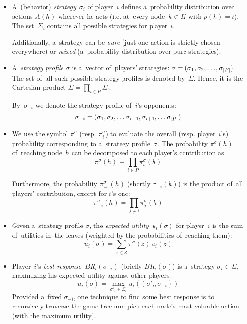 \begin{itemize}
  \item A~(behavior) \emph{strategy}~$\sigma_i$ of player~$i$ defines a~probability distribution over actions $A(h)$ wherever he acts (i.e. at~every node~$h \in H$ with $p(h) = i$).
    The set~$\Sigma_i$ contains all possible strategies for player~$i$.

  Additionally, a~strategy can be \emph{pure} (just one action is strictly chosen everywhere) or \emph{mixed} (a~probability distribution over pure strategies).

  \item A~\emph{strategy profile} $\sigma$ is a~vector of~players' strategies:
    $\sigma = (\sigma_1, \sigma_2, \ldots, \sigma_ {\left|{P}\right|})$.
    The set of~all such possible strategy profiles is denoted by~$\Sigma$.
    Hence, it is the Cartesian product $\Sigma = \prod_{i \in P} \Sigma_i$.

    By~$\sigma_{-i}$ we denote the strategy profile of~$i$'s opponents:
    \[ \sigma_{-i} = (\sigma_1, \sigma_2, \ldots \sigma_{i-1}, \sigma_{i+1}, \ldots \sigma_ {\left|{P}\right|}) \]

  \item We use the symbol $\pi^\sigma$ (resp. $\pi_i^\sigma$) to evaluate the overall (resp. player~$i$'s) probability corresponding to a~strategy profile~$\sigma$.
    The probability $\pi^\sigma(h)$ of~reaching node~$h$ can be decomposed to each player's contribution as
    \[ \pi ^\sigma(h) = \prod _{i \in P} \pi _i ^\sigma (h) \]

    Furthermore, the probability $\pi _{-i} ^\sigma (h)$ (shortly $\pi _{-i} (h)$) is the product of~all players' contribution, except for $i$'s one:
    \[ \pi _{-i} ^\sigma(h) = \prod _{j \ne i} \pi _j ^\sigma (h) \]
    
  \item Given a~strategy profile $\sigma$, the \emph{expected utility}~$u_i (\sigma)$ for player~$i$
    is the sum of~utilities in~the leaves (weighted by the probabilities of~reaching them):
    \[ u_i (\sigma) = \sum _{z \in Z} \pi^\sigma\!(z) \,u_i(z)\]

  \item Player~$i$'s \emph{best response}~$BR _i (\sigma _{-i})$ (briefly $BR _i (\sigma)$) is a~strategy $\sigma _i \in \Sigma _i$ maximizing his expected utility against other players:
    \[ u_i (\sigma) = \max _{\sigma'_i \in \Sigma_i} u_i ((\sigma'_i, \sigma_{-i})) \]
    Provided a~fixed $\sigma_{-i}$, one technique to find some best response is to recursively traverse the game tree and pick each node's most valuable action (with the maximum utility).
\end{itemize}

